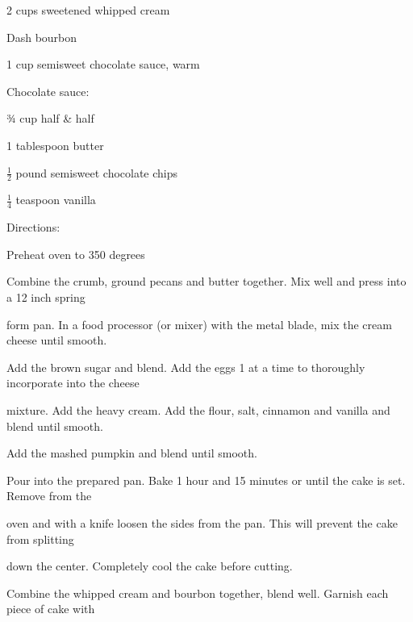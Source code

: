 \documentclass[a4paper,portrait,12pt]{book}
\begin{document}
2 cups sweetened whipped cream




Dash bourbon




1 cup semisweet chocolate sauce, warm




Chocolate sauce:




¾ cup half \& half




1 tablespoon butter




$\frac{1}{2}$ pound semisweet chocolate chips




$\frac{1}{4}$ teaspoon vanilla




Directions:




Preheat oven to 350 degrees




Combine the crumb, ground pecans and butter together. Mix well and press into a 12 inch spring




form pan. In a food processor (or mixer) with the metal blade, mix the cream cheese until smooth.




Add the brown sugar and blend. Add the eggs 1 at a time to thoroughly incorporate into the cheese




mixture. Add the heavy cream. Add the flour, salt, cinnamon and vanilla and blend until smooth.




Add the mashed pumpkin and blend until smooth.




Pour into the prepared pan. Bake 1 hour and 15 minutes or until the cake is set. Remove from the




oven and with a knife loosen the sides from the pan. This will prevent the cake from splitting




down the center. Completely cool the cake before cutting.




Combine the whipped cream and bourbon together, blend well. Garnish each piece of cake with
\end{document}
